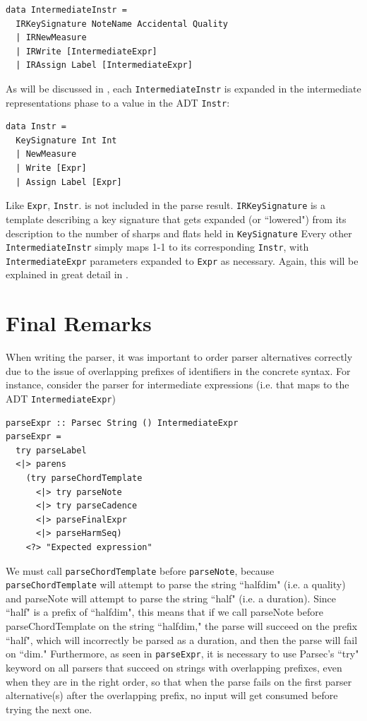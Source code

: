 \documentclass{report}
\begin{document}
\begin{verbatim}
data IntermediateInstr = 
  IRKeySignature NoteName Accidental Quality
  | IRNewMeasure
  | IRWrite [IntermediateExpr]
  | IRAssign Label [IntermediateExpr]
\end{verbatim}

As will be discussed in , each \verb.IntermediateInstr. is expanded in the intermediate representations phase to a value in the ADT \verb.Instr.:

\begin{verbatim}
data Instr = 
  KeySignature Int Int 
  | NewMeasure 
  | Write [Expr]
  | Assign Label [Expr] 
\end{verbatim}

Like \verb.Expr., \verb.Instr.. is not included in the parse result. \verb.IRKeySignature. is a template describing a key signature that gets expanded (or ``lowered") from its description to the number of sharps and flats held in \verb.KeySignature. Every other \verb.IntermediateInstr. simply maps 1-1 to its corresponding \verb.Instr., with \verb.IntermediateExpr. parameters expanded to \verb.Expr. as necessary. Again, this will be explained in great detail in .

\section{Final Remarks}
\label{sec:finalremarks}

When writing the parser, it was important to order parser alternatives correctly due to the issue of overlapping prefixes of identifiers in the concrete syntax. For instance, consider the parser for intermediate expressions (i.e. that maps to the ADT \verb.IntermediateExpr.)

\begin{verbatim}
parseExpr :: Parsec String () IntermediateExpr
parseExpr = 
  try parseLabel
  <|> parens 
    (try parseChordTemplate 
      <|> try parseNote
      <|> try parseCadence
      <|> parseFinalExpr
      <|> parseHarmSeq)
    <?> "Expected expression"
\end{verbatim}

We must call \verb.parseChordTemplate. before \verb.parseNote., because \verb.parseChordTemplate. will attempt to parse the string ``halfdim" (i.e. a quality) and parseNote will attempt to parse the string ``half" (i.e. a duration). Since ``half" is a prefix of ``halfdim", this means that if we call parseNote before parseChordTemplate on the string ``halfdim," the parse will succeed on the prefix ``half", which will incorrectly be parsed as a duration, and then the parse will fail on ``dim." Furthermore, as seen in \verb.parseExpr., it is necessary to use Parsec's ``try" keyword on all parsers that succeed on strings with overlapping prefixes, even when they are in the right order, so that when the parse fails on the first parser alternative(s) after the overlapping prefix, no input will get consumed before trying the next one.
\end{document}
